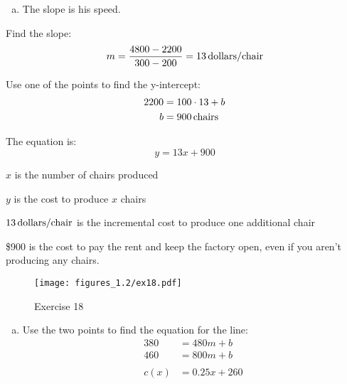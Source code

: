 \documentclass[letterpaper, landscape]{exam}
\begin{document}
\begin{description}
\begin{enumerate}[(a)]
          \item The slope is his speed.

        \end{enumerate}

      \item[16]
        Find the slope:
        \[
          m = \frac{4800 - 2200}{300 - 200} = \unit[13]{dollars/chair}
        \]

        Use one of the points to find the y-intercept:
        \begin{align*}
          2200 & = 100 \cdot 13 + b \\
          b    & = \unit[900]{chairs} \\
        \end{align*}

        The equation is:
        \[
          y = 13 x + 900
        \]

        \begin{itemize*}
          \item $x$ is the number of chairs produced
          \item $y$ is the cost to produce $x$ chairs
          \item $\unit[13]{dollars/chair}$ is the incremental cost to produce
            one additional chair
          \item \$900 is the cost to pay the rent and keep the factory open,
            even if you aren't producing any chairs.
        \end{itemize*}

      \item[18]
        \begin{figure}[H]
          \centering
          \texttt{[image: figures\_1.2/ex18.pdf]}
          \caption{Exercise 18}
          \label{fig:ex18}
        \end{figure}

        \begin{enumerate}[(a)]
          \item Use the two points to find the equation for the line:
            \begin{align*}
              380 &= 480 m + b \\
              460 &= 800 m + b \\
              \\
              c(x) &= 0.25 x + 260 \\
            \end{align*}


\end{enumerate}
\end{description}
\end{document}
